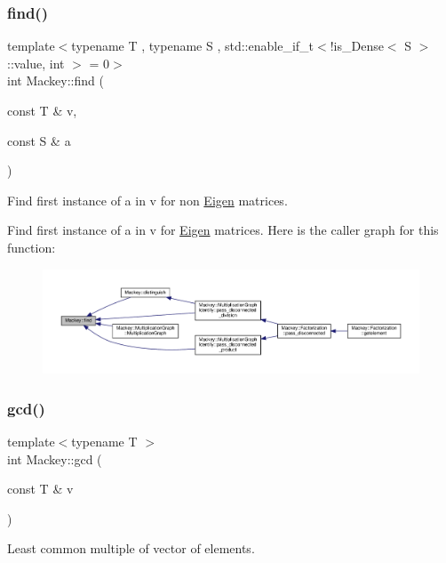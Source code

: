 \subsubsection{\texorpdfstring{find()}{find()}}
{\footnotesize\ttfamily template$<$typename T , typename S , std\+::enable\+\_\+if\+\_\+t$<$!is\+\_\+\+Dense$<$ S $>$\+::value, int $>$  = 0$>$ \\
int Mackey\+::find (\begin{DoxyParamCaption}\item[{const T \&}]{v,  }\item[{const S \&}]{a }\end{DoxyParamCaption})}



Find first instance of a in v for non \hyperlink{namespaceEigen}{Eigen} matrices. 

Find first instance of a in v for \hyperlink{namespaceEigen}{Eigen} matrices. Here is the caller graph for this function\+:\nopagebreak
\begin{figure}[H]
\begin{center}
\leavevmode
\includegraphics[width=350pt]{namespaceMackey_a91104eaef1ab349e68f0623cfaaf45c0_icgraph}
\end{center}
\end{figure}
\mbox{\label{namespaceMackey_a9c9c2faea24be988cdfcd773360134be}} 
\subsubsection{\texorpdfstring{gcd()}{gcd()}}
{\footnotesize\ttfamily template$<$typename T $>$ \\
int Mackey\+::gcd (\begin{DoxyParamCaption}\item[{const T \&}]{v }\end{DoxyParamCaption})}



Least common multiple of vector of elements. 

